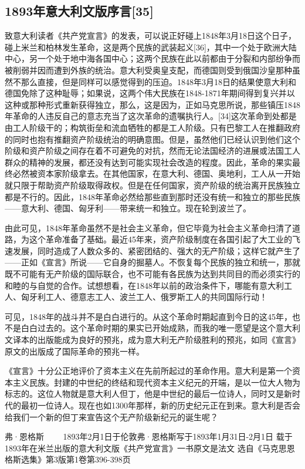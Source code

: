 \documentclass[UTF8,zihao=-4,a4paper]{ctexart}
\begin{document}
\subsection*{1893年意大利文版序言[35]}
致意大利读者《共产党宣言》的发表，可以说正好碰上1848年3月18日这个日子，碰上米兰和柏林发生革命，这是两个民族的武装起义[36]，其中一个处于欧洲大陆中心，另一个处于地中海各国中心；这两个民族在此以前都由于分裂和内部纷争而被削弱并因而遭到外族的统治。意大利受奥皇支配，而德国则受到俄国沙皇那种虽然不那么直接，但是同样可以感觉得到的压迫。1848年3月18日的结果使意大利和德国免除了这种耻辱；如果说，这两个伟大民族在1848-1871年期间得到复兴并以这种或那种形式重新获得独立，那么，这是因为，正如马克思所说，那些镇压1848年革命的人违反自己的意志充当了这次革命的遗嘱执行人。[34]这次革命到处都是由工人阶级干的；构筑街垒和流血牺牲的都是工人阶级。只有巴黎工人在推翻政府的同时也抱有推翻资产阶级统治的明确意图。但是，虽然他们已经认识到他们这个阶级和资产阶级之间存在着不可避免的对抗，然而无论法国经济的进展或法国工人群众的精神的发展，都还没有达到可能实现社会改造的程度。因此，革命的果实最终必然被资本家阶级拿去。在其他国家，在意大利、德国、奥地利，工人从一开始就只限于帮助资产阶级取得政权。但是在任何国家，资产阶级的统治离开民族独立都是不行的。因此，1848年革命必然给那些直到那时还没有统一和独立的那些民族——意大利、德国、匈牙利——带来统一和独立。现在轮到波兰了。\par
由此可见，1848年革命虽然不是社会主义革命，但它毕竟为社会主义革命扫清了道路，为这个革命准备了基础。最近45年来，资产阶级制度在各国引起了大工业的飞速发展，同时造成了人数众多的、紧密团结的、强大的无产阶级；这样它就产生了——正如《宣言》所说——它自身的掘墓人。不恢复每个民族的独立和统一，那就既不可能有无产阶级的国际联合，也不可能有各民族为达到共同目的而必须实行的和睦的与自觉的合作。试想想看，在1848年以前的政治条件下，哪能有意大利工人、匈牙利工人、德意志工人、波兰工人、俄罗斯工人的共同国际行动！\par
可见，1848年的战斗并不是白白进行的。从这个革命时期起直到今日的这45年，也不是白白过去的。这个革命时期的果实已开始成熟，而我的唯一愿望是这个意大利文译本的出版能成为良好的预兆，成为意大利无产阶级胜利的预兆，如同《宣言》原文的出版成了国际革命的预兆一样。\par
《宣言》十分公正地评价了资本主义在先前所起过的革命作用。意大利是第一个资本主义民族。封建的中世纪的终结和现代资本主义纪元的开端，是以一位大人物为标志的。这位人物就是意大利人但丁，他是中世纪的最后一位诗人，同时又是新时代的最初一位诗人。现在也如1300年那样，新的历史纪元正在到来。意大利是否会给我们一个新的但丁来宣告这个无产阶级新纪元的诞生呢？\par
弗·恩格斯 
 　　1893年2月1日于伦敦弗·恩格斯写于1893年1月31日-2月1日 
 载于1893年在米兰出版的意大利文版《共产党宣言》一书原文是法文 
 选自《马克思恩格斯选集》第3版第1卷第396-398页\par
\end{document}
